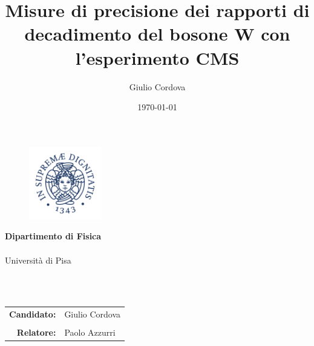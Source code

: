\documentclass[a4paper,11pt]{article}
\title{Misure di precisione dei rapporti di decadimento del bosone W con l'esperimento CMS}
\author{Giulio Cordova}
\date{\today}
\begin{document}
		\begin{titlepage}
			\thispagestyle{empty}
			\begin{figure}
				\includegraphics[width=31.5mm,right]{./Cherubino}
			\end{figure}
			\vspace*{-38mm}\hspace{-6mm}\textbf{\textcolor{blunipi}{\large{Dipartimento di Fisica}}}\\\\
			\hspace{-2mm}\textcolor{blunipi}{\large{Università di Pisa}}
			
			\vspace{15mm}
			\begin{center}
				\textcolor{blunipi}{\huge{\textbf{\thetitle}}}\\\vspace*{7mm}
				\textcolor{blunipi}{\thedate}\\\vspace*{10mm}
				
				\begin{tabular}{rl}
					\textbf{Candidato:} 
					& Giulio Cordova \\ \\
                    
                	\textbf{Relatore:} 
					& Paolo Azzurri \\
					
				\end{tabular}
				\vspace*{5mm}
\end{center}
								

\end{titlepage}
\end{document}

